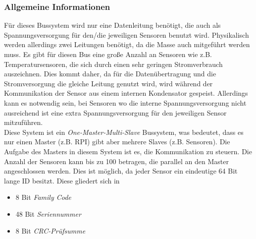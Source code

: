 \subsubsection{Allgemeine Informationen}
\label{subsection_Allgemeine_Informationen_1Wire}
 Für dieses Bussystem wird nur eine Datenleitung benötigt, die auch als Spannungsversorgung für den\;/\;die jeweiligen Sensoren benutzt wird. Physikalisch werden allerdings zwei Leitungen benötigt, da die Masse auch mitgeführt werden muss. Es gibt für diesen Bus eine große Anzahl an Sensoren wie z.B. Temperatursensoren, die sich durch einen sehr geringen Stromverbrauch auszeichnen. Dies kommt daher, da für die Datenübertragung und die Stromversorgung die gleiche Leitung genutzt wird, wird während der Kommunikation der Sensor aus einem internen Kondensator gespeist. Allerdings kann es notwendig sein, bei Sensoren wo die interne Spannungsversorgung nicht ausreichend ist  eine extra Spannungsversorgung für den jeweiligen Sensor mitzuführen. \\
Diese System ist ein \textit{One-Master-Multi-Slave} Bussystem, was bedeutet, dass es nur einen Master (z.B. \ac{RPI}) gibt aber mehrere Slaves (z.B. Sensoren). Die Aufgabe des Masters in diesem System ist es, die Kommunikation zu steuern. Die Anzahl der Sensoren kann bis zu 100 betragen, die parallel an den Master angeschlossen werden. Dies ist möglich, da jeder Sensor ein eindeutige 64 Bit lange ID besitzt. Diese gliedert sich in \citep{Bussysteme_in_der_Praxis}
\begin{itemize}
\item 8 Bit \textit{Family Code}
\item 48 Bit \textit{Seriennummer}
\item 8 Bit \textit{CRC-Prüfsumme}
\end{itemize}

